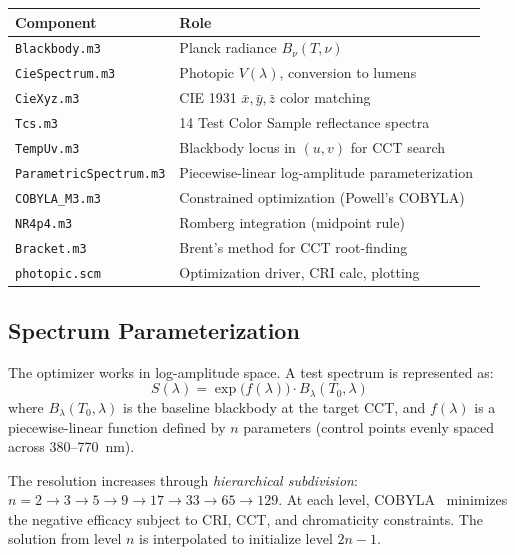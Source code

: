 \documentclass[11pt]{article}
\begin{document}
\begin{center}
\begin{tabular}{ll}
\toprule
\textbf{Component} & \textbf{Role} \\
\midrule
\texttt{Blackbody.m3}          & Planck radiance $B_\nu(T,\nu)$ \\
\texttt{CieSpectrum.m3}        & Photopic $V(\lambda)$, conversion to lumens \\
\texttt{CieXyz.m3}             & CIE 1931 $\bar{x},\bar{y},\bar{z}$ color matching \\
\texttt{Tcs.m3}                & 14 Test Color Sample reflectance spectra \\
\texttt{TempUv.m3}             & Blackbody locus in $(u,v)$ for CCT search \\
\texttt{ParametricSpectrum.m3} & Piecewise-linear log-amplitude parameterization \\
\texttt{COBYLA\_M3.m3}         & Constrained optimization (Powell's COBYLA) \\
\texttt{NR4p4.m3}              & Romberg integration (midpoint rule) \\
\texttt{Bracket.m3}            & Brent's method for CCT root-finding \\
\texttt{photopic.scm}          & Optimization driver, CRI calc, plotting \\
\bottomrule
\end{tabular}
\end{center}

\subsection{Spectrum Parameterization}

The optimizer works in log-amplitude space.  A test spectrum is represented as:
\begin{equation}
S(\lambda) = \exp\!\bigl(f(\lambda)\bigr) \cdot B_\lambda(T_0, \lambda)
\end{equation}
where $B_\lambda(T_0, \lambda)$ is the baseline blackbody at the target CCT,
and $f(\lambda)$ is a piecewise-linear function defined by $n$ parameters
(control points evenly spaced across 380--770~nm).

The resolution increases through \emph{hierarchical subdivision}:
$n = 2 \to 3 \to 5 \to 9 \to 17 \to 33 \to 65 \to 129$.  At each level,
COBYLA~\cite{powell1994} minimizes the negative efficacy subject to CRI, CCT,
and chromaticity constraints.  The solution from level $n$ is interpolated
to initialize level $2n-1$.
\end{document}
